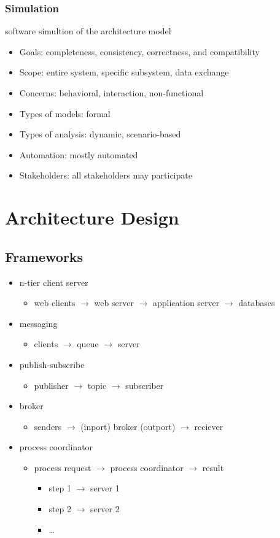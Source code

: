 \documentclass[]{article}
\theoremstyle{definition}
\begin{document}
	\subsubsection{Simulation}
	software simultion of the architecture model
	\begin{itemize}
		\item Goals: completeness, consistency, correctness, and compatibility
		\item Scope: entire system, specific subsystem, data exchange
		\item Concerns: behavioral, interaction, non-functional
		\item Types of models: formal
		\item Types of analysis: dynamic, scenario-based
		\item Automation: mostly automated
		\item Stakeholders: all stakeholders may participate
	\end{itemize}

	\section{Architecture Design}
	\subsection{Frameworks}
	\begin{itemize}
		\item n-tier client server
			\begin{itemize}
				\item web clients $\rightarrow$ web server $\rightarrow$ application server $\rightarrow$ databases
			\end{itemize}
		\item messaging
			\begin{itemize}
				\item clients $\rightarrow$ queue $\rightarrow$ server
			\end{itemize}
		\item publish-subscribe
			\begin{itemize}
				\item publisher $\rightarrow$ topic $\rightarrow$ subscriber
			\end{itemize}
		\item broker
			\begin{itemize}
				\item senders $\rightarrow$ (inport) broker (outport) $\rightarrow$ reciever
			\end{itemize}
		\item process coordinator
			\begin{itemize}
				\item process request $\rightarrow$ process coordinator $\rightarrow$ result
					\begin{itemize}
						\item step 1 $\rightarrow$ server 1
						\item step 2 $\rightarrow$ server 2
						\item \dots
					\end{itemize}
			\end{itemize}
	\end{itemize}
\end{document}
